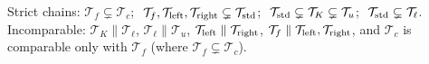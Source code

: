 \documentclass[11pt]{article}
\newcommand{\T}{\mathcal{T}}
\begin{document}
\begin{ans}
Strict chains: $\T_f\subsetneq\T_c$; $\ \T_f,\T_{\rm left},\T_{\rm right}\subsetneq\T_{\rm std}$; $\ \T_{\rm std}\subsetneq\T_K\subsetneq\T_u$; $\ \T_{\rm std}\subsetneq\T_\ell$.\\
Incomparable: $\T_K\parallel\T_\ell$, $\T_\ell\parallel\T_u$, $\T_{\rm left}\parallel\T_{\rm right}$, $\T_f\parallel\T_{\rm left},\T_{\rm right}$, and $\T_c$ is comparable only with $\T_f$ (where $\T_f\subsetneq\T_c$).
\end{ans}
\end{document}

